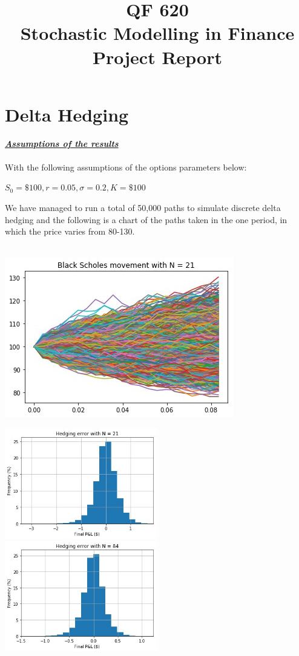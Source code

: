 \documentclass{article}
\title{QF 620 \protect \\ Stochastic Modelling in Finance\\
\textbf{Project Report}}
\date{}
\begin{document}
\section{Delta Hedging} 

\noindent \textbf{\textit{\underline{Assumptions of the results}}}\\ \\
With the following assumptions of the options parameters below:\\ 

\begin{center}
$S_0 = \$100 ,r = 0.05, \sigma = 0.2, K = \$100$ 
\end{center} 

\noindent We have managed to run a total of 50,000 paths to simulate discrete delta hedging and the following is a chart of the paths taken in the one period, in which the price varies from 80-130.\\ \\

\begin{center}
	\includegraphics{./images/BS_stock_paths.jpg}
\end{center}

\begin{center}
	\includegraphics[width=0.5\textwidth]{./images/21_steps_D_Hedge.jpg}%
	\includegraphics[width=0.5\textwidth]{./images/84_steps_D_Hedge.jpg}
\end{center}
\end{document}

